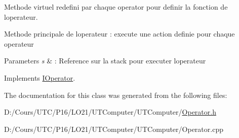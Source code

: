 Methode virtuel redefini par chaque operator pour definir la fonction de l\textquotesingle{}operateur. 

Methode principale de l\textquotesingle{}operateur \+: execute une action definie pour chaque operateur


\begin{DoxyParams}{Parameters}
{\em s} & \+: Reference sur la stack pour executer l\textquotesingle{}operateur \\
\hline
\end{DoxyParams}


Implements \hyperlink{class_i_operator_ab93ebb15195290da26e2f3e626f6f25e}{I\+Operator}.



The documentation for this class was generated from the following files\+:\begin{DoxyCompactItemize}
\item 
D\+:/\+Cours/\+U\+T\+C/\+P16/\+L\+O21/\+U\+T\+Computer/\+U\+T\+Computer/\hyperlink{_operator_8h}{Operator.\+h}\item 
D\+:/\+Cours/\+U\+T\+C/\+P16/\+L\+O21/\+U\+T\+Computer/\+U\+T\+Computer/Operator.\+cpp\end{DoxyCompactItemize}
